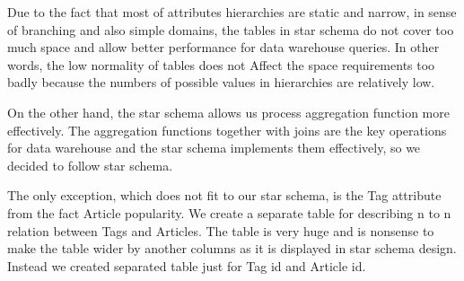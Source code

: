 Due to the fact that most of attributes hierarchies are static and narrow, in sense of branching and also simple domains, the tables in star schema do not cover too much space and allow better performance for data warehouse queries. In other words, the low normality of tables does not Affect the space requirements too badly because the numbers of possible values in hierarchies are relatively low.

On the other hand, the star schema allows us process aggregation function more effectively.
The aggregation functions together with joins are the key operations for data warehouse and
the star schema implements them effectively, so we decided to follow star schema.

The only exception, which does not fit to our star schema, is the Tag attribute from the fact Article popularity. We create a separate table for describing n to n relation between Tags and Articles. The table is very huge and is nonsense  to make the table wider by another columns as it is displayed in star schema design. Instead we created separated table just for Tag id and Article id.
